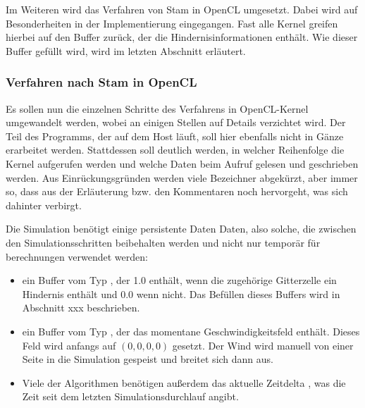 Im Weiteren wird das Verfahren von Stam in OpenCL umgesetzt. Dabei wird auf
Besonderheiten in der Implementierung eingegangen. Fast alle Kernel greifen
hierbei auf den Buffer zurück, der die Hindernisinformationen enthält. Wie
dieser Buffer gefüllt wird, wird im letzten Abschnitt erläutert.

\subsubsection{Verfahren nach Stam in OpenCL}

Es sollen nun die einzelnen Schritte des Verfahrens in OpenCL-Kernel umgewandelt
werden, wobei an einigen Stellen auf Details verzichtet wird. Der Teil des
Programms, der auf dem Host läuft, soll hier ebenfalls nicht in Gänze erarbeitet
werden. Stattdessen soll deutlich werden, in welcher Reihenfolge die Kernel
aufgerufen werden und welche Daten beim Aufruf gelesen und geschrieben werden.
Aus Einrückungsgründen werden viele Bezeichner abgekürzt, aber immer so, dass aus
der Erläuterung bzw. den Kommentaren noch hervorgeht, was sich dahinter
verbirgt.

Die Simulation benötigt einige persistente Daten Daten, also solche, die
zwischen den Simulationsschritten beibehalten werden und nicht nur temporär für
berechnungen verwendet werden:

\begin{itemize}
\item ein Buffer  vom Typ
, der 1.0 enthält, wenn die zugehörige Gitterzelle ein
Hindernis enthält und 0.0 wenn nicht. Das Befüllen dieses Buffers wird in
Abschnitt xxx beschrieben.
\item ein Buffer  vom Typ
, der das momentane Geschwindigkeitsfeld enthält.
Dieses Feld wird anfangs auf $(0,0,0,0)$ gesetzt. Der Wind wird manuell von
einer Seite in die Simulation gespeist und breitet sich dann aus.
\item Viele der Algorithmen benötigen außerdem das aktuelle Zeitdelta
, was die Zeit seit dem letzten Simulationsdurchlauf
angibt.
\end{itemize}

